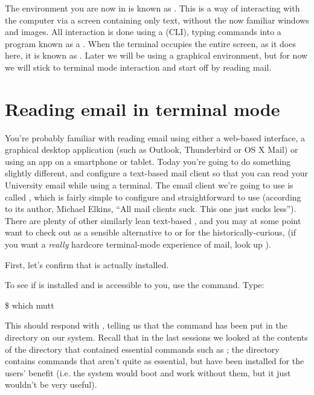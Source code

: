  The environment you are now in is known as . This is a way of interacting with  the computer via a screen containing only text, without the now familiar windows and images. All interaction is done using a  (CLI), typing commands into a program known as a . When the terminal occupies the entire screen, as it does here, it is known as .
 Later we will be using a graphical environment, but for now we will stick to terminal mode interaction and start off by reading mail.


\section{Reading email in terminal mode}

You're probably familiar with reading email using either a web-based interface, a graphical desktop application (such as Outlook, Thunderbird or OS X Mail) or using an app on a smartphone or tablet. Today you're going to do something slightly different, and configure a text-based mail client so that you can read your University email while using a terminal. The email client we're going to use is called , which is fairly simple to configure and straightforward to use (according to its author, Michael Elkins, ``All mail clients suck. This one just sucks less''). There are plenty of other similarly lean text-based , and you may at some point want to check out  as a sensible alternative to  or for the historically-curious,  (if you want a \textit{really} hardcore terminal-mode experience of mail, look up ).

First, let's confirm that  is actually installed. 

To see if  is installed and is accessible to you, use the  command. Type:

\begin{ttoutenv}
\$ which mutt
\end{ttoutenv}

This should respond with , telling us that the  command has been put in the  directory on our system. Recall that  in the last sessions we looked at the contents of the  directory that contained essential  commands such as ; the directory  contains commands that aren't quite as essential, but have been installed for the users' benefit (i.e. the system would boot and work without them, but it just wouldn't be very useful). 

